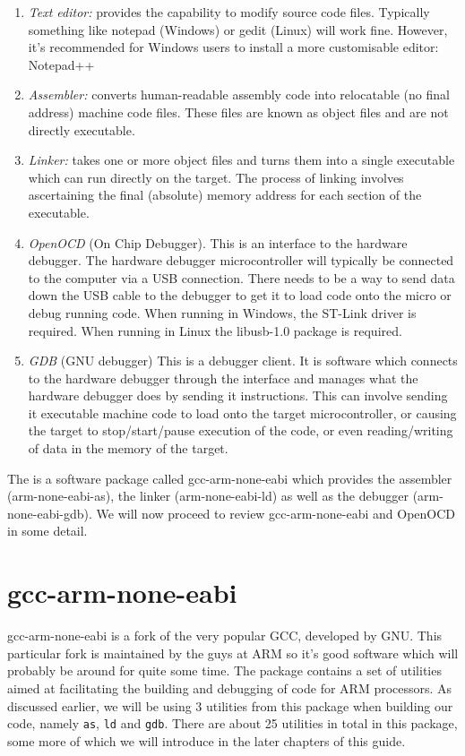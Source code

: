 \begin{enumerate}
\item \emph{Text editor:} provides the capability to modify source code files. Typically something like notepad (Windows) or gedit (Linux) will work fine. However, it's recommended for Windows users to install a more customisable editor: Notepad++
\item \emph{Assembler:} converts human-readable assembly code into relocatable (no final address) machine code files. These files are known as object files and are not directly executable. 
\item \emph{Linker:} takes one or more object files and turns them into a single executable which can run directly on the target. The process of linking involves ascertaining the final (absolute) memory address for each section of the executable.
\item \emph{OpenOCD} (On Chip Debugger). This is an interface to the hardware debugger. The hardware debugger microcontroller will typically be connected to the computer via a USB connection. There needs to be a way to send data down the USB cable to the debugger to get it to load code onto the micro or debug running code.
When running in Windows, the ST-Link driver is required. When running in Linux the libusb-1.0 package is required. 
\item \emph{GDB} (GNU debugger) This is a debugger client. It is software which connects to the hardware debugger through the interface and manages what the hardware debugger does by sending it instructions. This can involve sending it executable machine code to load onto the target microcontroller, or causing the target to stop/start/pause execution of the code, or even reading/writing of data in the memory of the target. 
\end{enumerate}

The is a software package called gcc-arm-none-eabi which provides the assembler (arm-none-eabi-as), the linker (arm-none-eabi-ld) as well as the debugger (arm-none-eabi-gdb). 
We will now proceed to review gcc-arm-none-eabi and OpenOCD in some detail.

\section{gcc-arm-none-eabi}
gcc-arm-none-eabi is a fork of the very popular GCC, developed by GNU. This particular fork is maintained by the guys at ARM so it's good software which will probably be around for quite some time. 
The package contains a set of utilities aimed at facilitating the building and debugging of code for ARM processors. 
As discussed earlier, we will be using 3 utilities from this package when building our code, namely \texttt{as}, \texttt{ld} and \texttt{gdb}. 
There are about 25 utilities in total in this package, some more of which we will introduce in the later chapters of this guide. 

